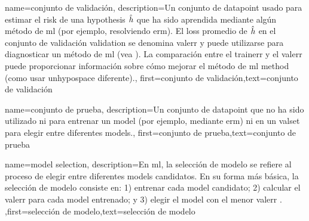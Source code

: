 {name={conjunto de validación},
  description={Un conjunto de \gls{datapoint} usado para 
  	estimar el \gls{risk} de una \gls{hypothesis} $\hat{h}$ que ha sido 
  	aprendida mediante algún método de \gls{ml} (por ejemplo, resolviendo \gls{erm}). El \gls{loss} promedio de $\hat{h}$ 
  	en el conjunto de validación \gls{validation} se denomina \gls{valerr} y puede utilizarse para diagnosticar un método de 
  	\gls{ml} (vea \cite[Sec. 6.6]{MLBasics}). La comparación entre el \gls{trainerr} 
  	y el \gls{valerr} puede proporcionar información sobre cómo mejorar el método de \gls{ml} method (como usar 
  	un\gls{hypospace} diferente).},
	first={conjunto de validación},text={conjunto de validación}  
}

{
	name={conjunto de prueba},
	description={Un conjunto de \gls{datapoint} que no ha sido 
		utilizado ni para entrenar un \gls{model} (por ejemplo, mediante \gls{erm}) ni en un 
		\gls{valset} para elegir entre diferentes \gls{model}s.}, 
	first={conjunto de prueba},text={conjunto de prueba}  
}


{name={model selection},
	description={En \gls{ml}, la selección de modelo se refiere al 
		proceso de elegir entre diferentes \gls{model}s candidatos. En su forma más  
		básica, la selección de modelo consiste en: 1) entrenar cada \gls{model} candidato; 
		2) calcular el \gls{valerr} para cada \gls{model} entrenado; y 3) elegir el \gls{model} 
		con el menor \gls{valerr} \cite[Ch. 6]{MLBasics}. },first={selección de modelo},text={selección de modelo}  
}







